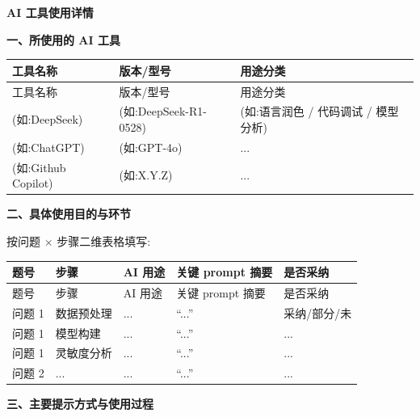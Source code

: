\documentclass[a4paper,12pt]{article}
\newcommand{\song}{\CJKfamily{song}}
\begin{document}
\thispagestyle{empty}

\begin{center}
{\song\bfseries{} AI 工具使用详情}
\end{center}

\vspace{1em}

\noindent\textbf{一、所使用的 AI 工具}

\begin{longtable}{>{\centering\arraybackslash}p{}>{\centering\arraybackslash}p{}>{\centering\arraybackslash}p{}}
  \toprule
  工具名称 & 版本/型号 & 用途分类 \\
  \midrule
  \endfirsthead
  \toprule
  工具名称 & 版本/型号 & 用途分类 \\
  \midrule
  \endhead
  \bottomrule
  \endfoot
  (如:DeepSeek)  & (如:DeepSeek-R1-0528)  & (如:语言润色 / 代码调试 / 模型分析) \\
  (如:ChatGPT)   & (如:GPT-4o)            & ... \\
  (如:Github Copilot) & (如:X.Y.Z)      & ... \\
\end{longtable}

\noindent\textbf{二、具体使用目的与环节}

按问题 $\times$ 步骤二维表格填写:

\begin{longtable}{>{\centering\arraybackslash}p{}>{\centering\arraybackslash}p{}>{\centering\arraybackslash}p{}>{\centering\arraybackslash}p{}>{\centering\arraybackslash}p{}}
  \toprule
  题号 & 步骤 & AI 用途 & 关键 prompt 摘要 & 是否采纳 \\
  \midrule
  \endfirsthead
  \toprule
  题号 & 步骤 & AI 用途 & 关键 prompt 摘要 & 是否采纳 \\
  \midrule
  \endhead
  \bottomrule
  \endfoot
  问题 1 & 数据预处理 & ... & ``...'' & 采纳/部分/未 \\
  问题 1 & 模型构建   & ... & ``...'' & ... \\
  问题 1 & 灵敏度分析 & ... & ``...'' & ... \\
  问题 2 & ...        & ... & ``...'' & ... \\
\end{longtable}

\noindent\textbf{三、主要提示方式与使用过程}
\end{document}
